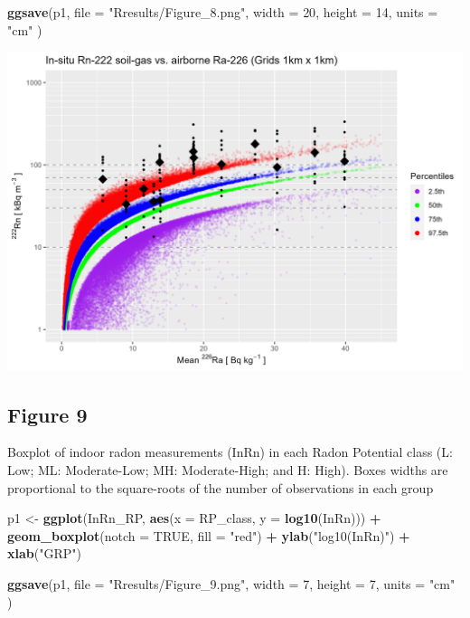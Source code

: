 \documentclass[
  12pt,
]{article}
\newenvironment{Shaded}{\begin{snugshade}}{\end{snugshade}}
\newcommand{\DataTypeTok}[1]{\textcolor[rgb]{0.13,0.29,0.53}{#1}}
\newcommand{\DecValTok}[1]{\textcolor[rgb]{0.00,0.00,0.81}{#1}}
\newcommand{\KeywordTok}[1]{\textcolor[rgb]{0.13,0.29,0.53}{\textbf{#1}}}
\newcommand{\NormalTok}[1]{#1}
\newcommand{\OperatorTok}[1]{\textcolor[rgb]{0.81,0.36,0.00}{\textbf{#1}}}
\newcommand{\OtherTok}[1]{\textcolor[rgb]{0.56,0.35,0.01}{#1}}
\newcommand{\StringTok}[1]{\textcolor[rgb]{0.31,0.60,0.02}{#1}}
\begin{document}
\begin{Shaded}
\begin{Highlighting}[]
  \KeywordTok{ggsave}\NormalTok{(p1,}
         \DataTypeTok{file =} \StringTok{"Rresults/Figure\_8.png"}\NormalTok{,}
         \DataTypeTok{width =} \DecValTok{20}\NormalTok{,}
         \DataTypeTok{height =} \DecValTok{14}\NormalTok{,}
         \DataTypeTok{units =} \StringTok{"cm"}\NormalTok{ )}
\end{Highlighting}
\end{Shaded}

\begin{center}\includegraphics[width=0.5\linewidth]{Rresults/Figure_8} \end{center}

\hypertarget{figure-9}{%
\subsection{Figure 9}\label{figure-9}}

Boxplot of indoor radon measurements (InRn) in each Radon Potential
class (L: Low; ML: Moderate-Low; MH: Moderate-High; and H: High). Boxes
widths are proportional to the square-roots of the number of
observations in each group

\begin{Shaded}
\begin{Highlighting}[]
\NormalTok{  p1 \textless{}{-}}\StringTok{ }\KeywordTok{ggplot}\NormalTok{(InRn\_RP, }\KeywordTok{aes}\NormalTok{(}\DataTypeTok{x =}\NormalTok{ RP\_class, }\DataTypeTok{y =} \KeywordTok{log10}\NormalTok{(InRn))) }\OperatorTok{+}\StringTok{ }
\StringTok{    }\KeywordTok{geom\_boxplot}\NormalTok{(}\DataTypeTok{notch =} \OtherTok{TRUE}\NormalTok{, }\DataTypeTok{fill =} \StringTok{"red"}\NormalTok{) }\OperatorTok{+}
\StringTok{    }\KeywordTok{ylab}\NormalTok{(}\StringTok{"log10(InRn)"}\NormalTok{) }\OperatorTok{+}
\StringTok{    }\KeywordTok{xlab}\NormalTok{(}\StringTok{"GRP"}\NormalTok{)}

  \KeywordTok{ggsave}\NormalTok{(p1,}
         \DataTypeTok{file =} \StringTok{"Rresults/Figure\_9.png"}\NormalTok{,}
         \DataTypeTok{width =} \DecValTok{7}\NormalTok{,}
         \DataTypeTok{height =} \DecValTok{7}\NormalTok{,}
         \DataTypeTok{units =} \StringTok{"cm"}\NormalTok{ )}
\end{Highlighting}
\end{Shaded}
\end{document}

